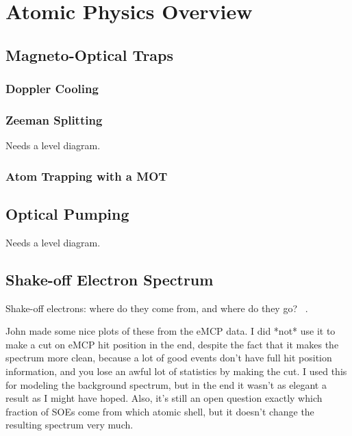 




\clearpage
\chapter{Atomic Physics Overview}
\label{atomicphysics_chapter}
\section{Magneto-Optical Traps}
	\subsection{Doppler Cooling}
	\subsection{Zeeman Splitting}
	Needs a level diagram.
	\subsection{Atom Trapping with a MOT}

\section{Optical Pumping}
Needs a level diagram.


\section{Shake-off Electron Spectrum}
Shake-off electrons:  where do they come from, and where do they go?  ~\cite{Levinger}.

John made some nice plots of these from the eMCP data.  I did *not* use it to make a cut on eMCP hit position in the end, despite the fact that it makes the spectrum more clean, because a lot of good events don't have full hit position information, and you lose an awful lot of statistics by making the cut.  I used this for modeling the background spectrum, but in the end it wasn't as elegant a result as I might have hoped.  Also, it's still an open question exactly which fraction of SOEs come from which atomic shell, but it doesn't change the resulting spectrum very much.


































